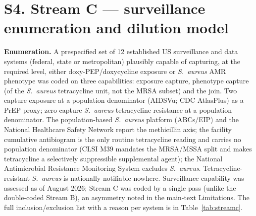 \documentclass[11pt,a4paper]{article}
\newcommand{\sa}{\emph{S.~aureus}}
\begin{document}
\section*{S4. Stream C --- surveillance enumeration and dilution model}

\textbf{Enumeration.} A prespecified set of 12 established US surveillance and
data systems (federal, state or metropolitan) plausibly capable of capturing, at
the required level, either doxy-PEP/doxycycline exposure or \sa{} AMR phenotype was
coded on three capabilities: exposure capture, phenotype capture (of the \sa{}
tetracycline unit, not the MRSA subset) and the join. Two capture exposure at a
population denominator (AIDSVu; CDC AtlasPlus) as a PrEP proxy; zero capture \sa{}
tetracycline resistance at a population denominator. The population-based \sa{}
platform (ABCs/EIP) and the National Healthcare Safety Network report the
methicillin axis; the facility cumulative antibiogram is the only routine
tetracycline reading and carries no population denominator (CLSI M39 mandates the
MRSA/MSSA split and makes tetracycline a selectively suppressible supplemental
agent); the National Antimicrobial Resistance Monitoring System excludes \sa{}.
Tetracycline-resistant \sa{} is nationally notifiable nowhere. Surveillance
capability was assessed as of August 2026; Stream C was coded by a single pass
(unlike the double-coded Stream B), an asymmetry noted in the main-text
Limitations. The full inclusion/exclusion list with a reason per system is in
Table~\ref{tab:streamc}.
\end{document}

